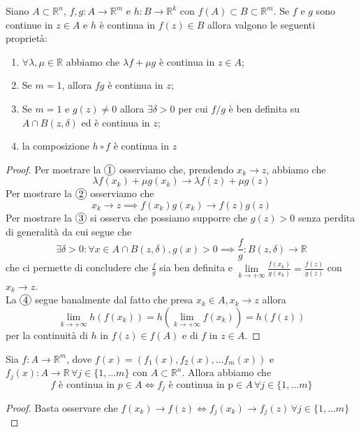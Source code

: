 \documentclass[openany]{book}
\begin{document}
\begin{theorem}[teorema C2]
Siano $A \subset \mathbb{R}^n$, $f, g: A \to \mathbb{R}^m$ e $h: B \to \mathbb{R}^k$ con $f(A) \subset B \subset \mathbb{R}^m$. Se $f$ e $g$ sono continue in $z \in A$ e $h$ è continua in $f(z) \in B$ allora valgono le seguenti proprietà:
\begin{enumerate}[label=\protect\circled{\arabic*}]
	\item $\forall \lambda, \mu \in \mathbb{R}$ abbiamo che $\lambda f + \mu g$ è continua in $z \in A$;
	\item Se $m = 1$, allora $fg$ è continua in $z$;
	\item Se $m=1$ e $g(z) \neq 0$ allora $\exists \delta > 0$ per cui $f/g$ è ben definita su $A \cap B(z, \delta)$ ed è continua in $z$;
	 \item la composizione $h \circ f$ è continua in $z$
\end{enumerate}
\end{theorem}
\begin{proof}
Per mostrare la $\circled{1}$ osserviamo che, prendendo $x_k \to z$, abbiamo che
$$
\lambda f(x_k) + \mu g(x_k) \to \lambda f(z) + \mu g(z)
$$
Per mostrare la $\circled{2}$ osserviamo che
$$
x_k \to z \implies f(x_k)g(x_k) \to f(z)g(z)
$$
Per mostrare la $\circled{3}$ si osserva che possiamo supporre che $g(z) > 0$ senza perdita di generalità da cui segue che
$$
\exists \delta > 0: \forall x \in A \cap B(z, \delta), g(x) > 0 \implies \frac{f}{g}: B(z, \delta) \to \mathbb{R}
$$
che ci permette di concludere che $\frac{f}{g}$ sia ben definita e $\lim\limits_{k \to +\infty} \frac{f(x_k)}{g(x_k)} = \frac{f(z)}{g(z)}$ con $x_k \to z$. \\
La $\circled{4}$ segue banalmente dal fatto che presa $x_k \in A, x_k \to z$ allora
$$
\lim_{k \to +\infty} h(f(x_k)) = h(\lim_{k \to +\infty} f(x_k)) = h(f(z))
$$
per la continuità di $h$ in $f(z) \in f(A)$ e di $f$ in $z \in A$.
\end{proof}
\begin{prop}
Sia $f: A \to \mathbb{R}^m$, dove $f(x) = (f_1(x), f_2(x), \ldots f_m(x))$ e $f_j(x): A \to \mathbb{R} \, \forall j \in \{1, \ldots m\}$ con $A \subset \mathbb{R}^n$. Allora abbiamo che
	$$f \text{ è continua in } p \in A \iff f_j \text{ è continua in p} \in A \, \forall j \in \{1, \ldots m\}$$
\end{prop}
\begin{proof}
Basta osservare che $f(x_k) \to f(z) \iff f_j(x_k) \to f_j(z) \, \forall j \in \{1, \ldots m \}$
\end{proof}
\end{document}
